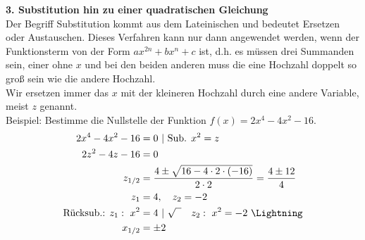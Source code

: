 \textbf{3. Substitution hin zu einer quadratischen Gleichung}\\
Der Begriff Substitution kommt aus dem Lateinischen und bedeutet Ersetzen oder Austauschen. Dieses Verfahren kann nur dann angewendet werden, wenn der Funktionsterm von der Form \(ax^{2n}+bx^n+c\) ist, d.h. es müssen drei Summanden sein, einer ohne \(x\) und bei den beiden anderen muss die eine Hochzahl doppelt so groß sein wie die andere Hochzahl.\\
Wir ersetzen immer das \(x\) mit der kleineren Hochzahl durch eine andere Variable, meist \(z\) genannt.\\
Beispiel: Bestimme die Nullstelle der Funktion \(f(x)=2x^4-4x^2-16\).
\textcolor{loes}{\begin{align*}\large
		2x^4-4x^2-16&=0\ |\ \text{Sub. }x^2=z\\
		2z^2-4z-16&=0\\
		z_{1/2}&=\frac{4\pm\sqrt{16-4\cdot 2\cdot \left( -16\right) }}{2\cdot 2}=\frac{4\pm 12}{4}\\
		z_1&=4,\quad z_2=-2\\
		\text{Rücksub.: }z_1:\ x^2&=4\ |\ \sqrt{\phantom{x}}\quad z_2:\ x^2=-2\ \Lightning\\
		x_{1/2}&=\pm2
\end{align*}}
\newpage
